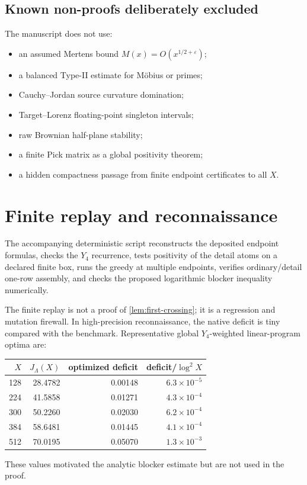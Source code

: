 \documentclass[11pt]{article}
\newcommand{\Yfour}{Y_4}
\newcommand{\Jnat}{J_\Lambda}
\newcommand{\eps}{\varepsilon}
\begin{document}
\subsection{Known non-proofs deliberately excluded}

The manuscript does not use:
\begin{itemize}
\item an assumed Mertens bound $M(x)=O(x^{1/2+\eps})$;
\item a balanced Type-II estimate for M\"obius or primes;
\item Cauchy--Jordan source curvature domination;
\item Target--Lorenz floating-point singleton intervals;
\item raw Brownian half-plane stability;
\item a finite Pick matrix as a global positivity theorem;
\item a hidden compactness passage from finite endpoint certificates to all $X$.
\end{itemize}

\section{Finite replay and reconnaissance}

The accompanying deterministic script reconstructs the deposited endpoint formulas, checks the $\Yfour$ recurrence, tests positivity of the detail atoms on a declared finite box, runs the greedy at multiple endpoints, verifies ordinary/detail one-row assembly, and checks the proposed logarithmic blocker inequality numerically.

The finite replay is not a proof of \cref{lem:first-crossing}; it is a regression and mutation firewall. In high-precision reconnaissance, the native deficit is tiny compared with the benchmark. Representative global $\Yfour$-weighted linear-program optima are:
\begin{center}
\begin{tabular}{rrrr}
\toprule
$X$ & $\Jnat(X)$ & optimized deficit & deficit/$\log^2X$\\
\midrule
128 & 28.4782 & 0.00148 & $6.3\times10^{-5}$\\
224 & 41.5858 & 0.01271 & $4.3\times10^{-4}$\\
300 & 50.2260 & 0.02030 & $6.2\times10^{-4}$\\
384 & 58.6481 & 0.01445 & $4.1\times10^{-4}$\\
512 & 70.0195 & 0.05070 & $1.3\times10^{-3}$\\
\bottomrule
\end{tabular}
\end{center}
These values motivated the analytic blocker estimate but are not used in the proof.
\end{document}
